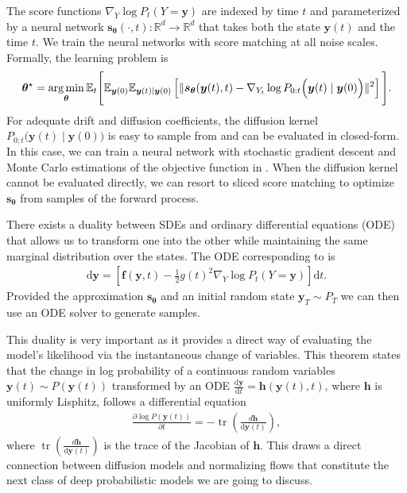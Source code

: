 The score functions $\nabla_Y \log P_t(Y=\bm{y})$ are indexed by time $t$ and parameterized by a neural network $\bm{s}_{\bm{\theta}}(\cdot, t) : \mathbb{R}^d \rightarrow \mathbb{R}^d$ that takes both the state $\bm{y}(t)$ and the time $t$. We train the neural networks with score matching at all noise scales. Formally, the learning problem is
\begin{align}
  \bm{\theta}^\star = \operatorname*{arg\,min}_{\bm{\theta}} \mathbb{E}_t\Bigg[ \mathbb{E}_{\bm{y}(0)} \mathbb{E}_{\bm{y}(t)\mid \bm{y}(0)}\left[ \lVert \bm{s}_{\bm{\theta}}(\bm{y}(t), t) - \nabla_{Y_t} \log P_{0:t}\Big(\bm{y}(t) \mid \bm{y}(0)\Big) \rVert^2 \right] \Bigg]. \label{eq:continuous_diffusion_objective}
\end{align}
For adequate drift and diffusion coefficients, the diffusion kernel $P_{0:t}\Big(\bm{y}(t) \mid \bm{y}(0)\Big)$ is easy to sample from and can be evaluated in closed-form. In this case, we can train a neural network with stochastic gradient descent and Monte Carlo estimations of the objective function in . When the diffusion kernel cannot be evaluated directly, we can resort to sliced score matching \citep{song2020sliced} to optimize $\bm{s}_{\bm{\theta }}$ from samples of the forward process.

There exists a duality between SDEs and ordinary differential equations (ODE) that allows us to transform one into the other while maintaining the same marginal distribution over the states. The ODE corresponding to  is
\begin{align}
  \text{d}\bm{y} = \left[ \bm{f}(\bm{y}, t) - \frac{1}{2}g(t)^2 \nabla_Y \log P_t(Y=\bm{y}) \right] \text{d}t.
\end{align}
Provided the approximation $\bm{s}_{\bm{\theta}}$ and an initial random state $\bm{y}_T \sim P_T$ we can then use an ODE solver to generate samples.

This duality is very important as it provides a direct way of evaluating the model's likelihood via the instantaneous change of variables. This theorem states that the change in log probability of a continuous random variables $\bm{y}(t) \sim P(\bm{y}(t))$ transformed by an ODE $\frac{\text{d}\bm{y}}{\text{d}t} = \bm{h}(\bm{y}(t), t)$, where $\bm{h}$ is uniformly Lisphitz, follows a differential equation
\begin{align}
  \frac{\partial \log P(\bm{y}(t))}{\partial t} = -\operatorname{tr}(\frac{d\bm{h}}{\text{d}\bm{y}(t)}), \label{eq:NODE_NF}
\end{align}
where $\operatorname{tr}(\frac{d\bm{h}}{\text{d}\bm{y}(t)})$ is the trace of the Jacobian of $\bm{h}$. This draws a direct connection between diffusion models and normalizing flows that constitute the next class of deep probabilistic models we are going to discuss.

